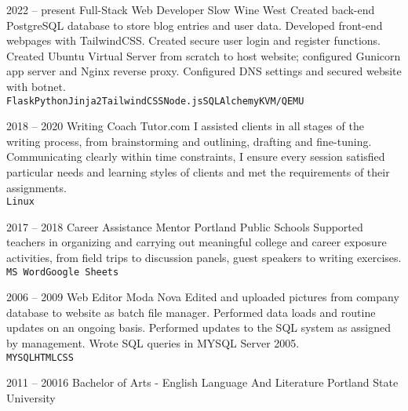\documentclass[9pt]{developercv} %
\begin{document}
\begin{entrylist}
		\entry
		{2022 -- present}
		{Full-Stack Web Developer}
		{Slow Wine West}
		{Created back-end PostgreSQL database to store blog entries and user data.
		Developed front-end webpages with TailwindCSS. Created secure user login and register functions. Created Ubuntu
		Virtual Server from scratch to host website; configured Gunicorn app server and Nginx reverse proxy. Configured DNS settings and secured website with botnet.
		\\ \texttt{Flask}\slashsep\texttt{Python}\slashsep\texttt{Jinja2}\slashsep\texttt{TailwindCSS}\slashsep\texttt{Node.js}\slashsep\texttt{SQLAlchemy}\slashsep\texttt{KVM/QEMU}}
		
	\entry
		{2018 -- 2020}
		{Writing Coach}
		{Tutor.com}
		{I assisted clients in all stages of the writing process, from
		brainstorming and outlining, drafting and fine-tuning. Communicating clearly
		within time constraints, I ensure every session satisfied particular needs and
		learning styles of clients and met the requirements of their assignments.
		\\ \texttt{Linux}}

	\entry
		{2017 -- 2018}
		{Career Assistance Mentor}
		{Portland Public Schools}
		{Supported teachers in organizing and carrying out meaningful college and
		career exposure activities, from field trips to discussion panels, guest
		speakers to writing exercises.
		\\ \texttt{MS Word}\slashsep\texttt{Google Sheets}}
		
	\entry
		{2006 -- 2009}
		{Web Editor}
		{Moda Nova}
		{Edited and uploaded pictures from company database to website as batch file manager. Performed data loads and routine updates on an ongoing basis. 
		Performed updates to the SQL system as assigned by management.		
		Wrote SQL queries in MYSQL Server 2005.
		\\ \texttt{MYSQL}\slashsep\texttt{HTML}\slashsep\texttt{CSS}}
\end{entrylist}



\begin{entrylist}
	\entry
		{2011 -- 20016}
		{Bachelor of Arts - English Language And Literature}
		{Portland State University}
		
\end{entrylist}
\end{document}
